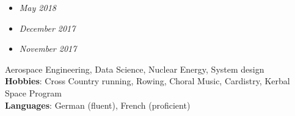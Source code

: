 \documentclass[11pt]{article}
\begin{document}
\spacedhrule{0em}{-0.8em}

\vspace{0.3em}
\begin{itemize}
	\item { 
		{\textit{May 2018}} {} }
	\item { 
		{\textit{December 2017}} {}}
	\item { 
		{\textit{November 2017}} {}}
\end{itemize}

\spacedhrule{-.5em}{-0.7em}

\vspace{-0.65cm}
\hspace{1.8cm}
Aerospace Engineering, Data Science, Nuclear Energy, System design \\
\textbf{Hobbies}: Cross Country running, Rowing, Choral Music, Cardistry, Kerbal Space Program\\
\textbf{Languages}: German (fluent), French (proficient)
\end{document}
